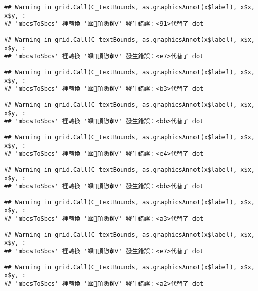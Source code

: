 \documentclass[
]{article}
\begin{document}
\begin{verbatim}
## Warning in grid.Call(C_textBounds, as.graphicsAnnot(x$label), x$x, x$y, :
## 'mbcsToSbcs' 裡轉換 '蝘頂隞�Ⅳ' 發生錯誤：<91>代替了 dot
\end{verbatim}

\begin{verbatim}
## Warning in grid.Call(C_textBounds, as.graphicsAnnot(x$label), x$x, x$y, :
## 'mbcsToSbcs' 裡轉換 '蝘頂隞�Ⅳ' 發生錯誤：<e7>代替了 dot
\end{verbatim}

\begin{verbatim}
## Warning in grid.Call(C_textBounds, as.graphicsAnnot(x$label), x$x, x$y, :
## 'mbcsToSbcs' 裡轉換 '蝘頂隞�Ⅳ' 發生錯誤：<b3>代替了 dot
\end{verbatim}

\begin{verbatim}
## Warning in grid.Call(C_textBounds, as.graphicsAnnot(x$label), x$x, x$y, :
## 'mbcsToSbcs' 裡轉換 '蝘頂隞�Ⅳ' 發生錯誤：<bb>代替了 dot
\end{verbatim}

\begin{verbatim}
## Warning in grid.Call(C_textBounds, as.graphicsAnnot(x$label), x$x, x$y, :
## 'mbcsToSbcs' 裡轉換 '蝘頂隞�Ⅳ' 發生錯誤：<e4>代替了 dot
\end{verbatim}

\begin{verbatim}
## Warning in grid.Call(C_textBounds, as.graphicsAnnot(x$label), x$x, x$y, :
## 'mbcsToSbcs' 裡轉換 '蝘頂隞�Ⅳ' 發生錯誤：<bb>代替了 dot
\end{verbatim}

\begin{verbatim}
## Warning in grid.Call(C_textBounds, as.graphicsAnnot(x$label), x$x, x$y, :
## 'mbcsToSbcs' 裡轉換 '蝘頂隞�Ⅳ' 發生錯誤：<a3>代替了 dot
\end{verbatim}

\begin{verbatim}
## Warning in grid.Call(C_textBounds, as.graphicsAnnot(x$label), x$x, x$y, :
## 'mbcsToSbcs' 裡轉換 '蝘頂隞�Ⅳ' 發生錯誤：<e7>代替了 dot
\end{verbatim}

\begin{verbatim}
## Warning in grid.Call(C_textBounds, as.graphicsAnnot(x$label), x$x, x$y, :
## 'mbcsToSbcs' 裡轉換 '蝘頂隞�Ⅳ' 發生錯誤：<a2>代替了 dot
\end{verbatim}
\end{document}
